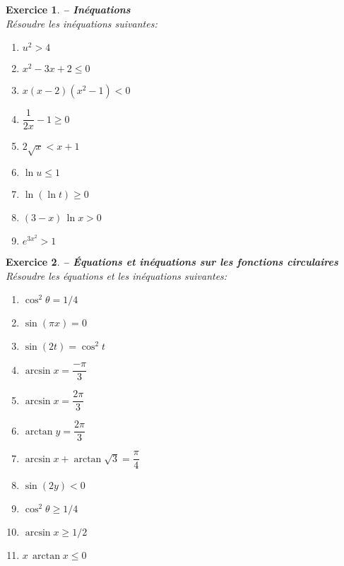 \documentclass[a4paper,11pt]{article}
\newcommand{\ch}{\mathrm{ch}\,}
\newcommand{\sh}{\mathrm{sh}\,}
\newenvironment{alphate}{\begin{enumerate}[label=\alph*)]}{\end{enumerate}}
\newtheorem{exo}{Exercice}
\newenvironment{exercice}{\begin{exo} \em}{\end{exo}}
\begin{document}
\begin{exercice} {\bf -- In\'equations} \\ 
R\'esoudre les in\'equations suivantes:
\begin{multicols}{3}
\begin{alphate}
\item $u^2 > 4$ \smallskip 
\item $x^2-3x+2 \leq 0$ \smallskip 
\item $x(x-2)(x^2-1) < 0$ \smallskip 
\item $\dfrac{1}{2x}-1 \geq 0$ \smallskip 
\item $2\sqrt{x} < x+1$ \smallskip 
\item $\ln u \leq 1$ \smallskip 
\item $\ln(\ln t) \geq 0$ \smallskip 
\item $(3-x)\,\ln x > 0$ \smallskip 
\item $e^{3x^2} > 1$ \smallskip 
\end{alphate}
\end{multicols}
\end{exercice}
\bigskip 


\begin{exercice} {\bf -- \'Equations et in\'equations sur les fonctions 
circulaires} \\ 
R\'esoudre les \'equations et les in\'equations suivantes:
\begin{multicols}{3}
\begin{alphate}
\item $\cos^2 \theta = 1/4$ \smallskip 
\item $\sin(\pi x) = 0$ \smallskip 
\item $\sin(2t) = \cos^2 t$ \smallskip 
\item $\arcsin x =\dfrac{-\pi}{3}$ \smallskip 
\item $\arcsin x =\dfrac{2\pi}{3}$ \smallskip 
\item $\arctan y =\dfrac{2\pi}{3}$ \smallskip 
\item $\arcsin x + \arctan \sqrt{3} =\dfrac{\pi}{4}$ \smallskip 
\item $\sin(2y) < 0$
\item $\cos^2 \theta \geq 1/4$
\item $\arcsin x \geq 1/2$
\item $x\,\arctan x \leq 0$
\end{alphate}
\end{multicols}
\end{exercice}
\bigskip 


\end{document}
